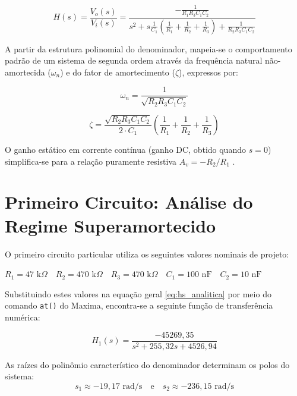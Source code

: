 \begin{equation}
	H(s) = \frac{V_o(s)}{V_i(s)} = \frac{- \frac{1}{R_1 R_3 C_1 C_2}}{s^2 + s \frac{1}{C_1} \left( \frac{1}{R_1} + \frac{1}{R_2} + \frac{1}{R_3} \right) + \frac{1}{R_2 R_3 C_1 C_2}}
	\label{eq:hs_analitica}
\end{equation}

A partir da estrutura polinomial do denominador, mapeia-se o comportamento padrão de um sistema de segunda ordem através da frequência natural não-amortecida ($\omega_n$) e do fator de amortecimento ($\zeta$), expressos por:

\begin{equation}
	\omega_n = \frac{1}{\sqrt{R_2 R_3 C_1 C_2}}
\end{equation}

\begin{equation}
	\zeta = \frac{\sqrt{R_2 R_3 C_1 C_2}}{2 \cdot C_1} \left( \frac{1}{R_1} + \frac{1}{R_2} + \frac{1}{R_3} \right)
\end{equation}

O ganho estático em corrente contínua (ganho DC, obtido quando $s = 0$) simplifica-se para a relação puramente resistiva $A_v = -R_2/R_1$ \cite{nilsson}.

\section{Primeiro Circuito: Análise do Regime Superamortecido}

O primeiro circuito particular utiliza os seguintes valores nominais de projeto:
\begin{center}
	$R_1 = 47\text{ k}\Omega \quad R_2 = 470\text{ k}\Omega \quad R_3 = 470\text{ k}\Omega \quad C_1 = 100\text{ nF} \quad C_2 = 10\text{ nF}$
\end{center}

Substituindo estes valores na equação geral \ref{eq:hs_analitica} por meio do comando \texttt{at()} do Maxima, encontra-se a seguinte função de transferência numérica:

\begin{equation}
	H_1(s) = \frac{-45269,35}{s^2 + 255,32s + 4526,94}
\end{equation}

As raízes do polinômio característico do denominador determinam os polos do sistema:
\begin{equation}
	s_1 \approx -19,17\text{ rad/s} \quad \text{e} \quad s_2 \approx -236,15\text{ rad/s}
\end{equation}

